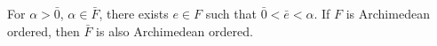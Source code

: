 For $\alpha > \bar{0}$, $\alpha \in \bar{F}$, there exists $e \in F$ such that $\bar{0} < \bar{e} < \alpha$. If $F$ is Archimedean ordered, then $\bar{F}$ is also Archimedean ordered.